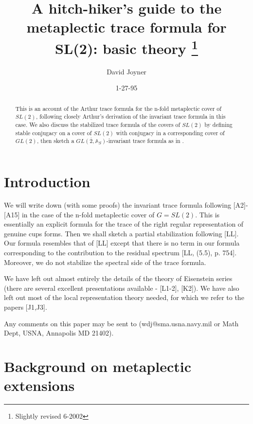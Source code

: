 \documentclass[amsfonts,12pt]{article}
\def\aaa{\mathbb{A}}
\begin{document}
\author{David Joyner}
\title{A hitch-hiker's guide to the
metaplectic trace formula for SL(2): basic theory
\thanks{Slightly revised 6-2002}}
\date{1-27-95}
\maketitle

\begin{abstract}
This is an account of the Arthur trace formula for the
n-fold metaplectic cover of $SL(2)$, following closely
Arthur's derivation of the invariant trace formula in this case.
We also discuss the stabilized trace formula of
the covers of $SL(2)$ by defining
stable conjugacy on a cover of $SL(2)$ with conjugacy
in a corresponding cover of $GL(2)$,
then sketch a $\overline{GL(2,\aaa _S)}$-invariant
trace formula as in \cite{LL}.
\end{abstract}

\tableofcontents

\section{Introduction}

We will write down (with some proofs) the invariant trace
formula following [A2]-[A15] in the case of the
n-fold metaplectic cover of $G=SL(2)$.
This is essentially an explicit formula for the trace of
the right regular representation of
genuine cups forms.
Then we shall sketch a partial stabilization following [LL].
Our formula resembles that of [LL] except that there
is no term in our formula corresponding to the
contribution to the residual spectrum
[LL, (5.5), p. 754]. Moreover, we do not stabilize the spectral
side of the trace formula.

We have left out almost entirely the details of the theory of
Eisenstein
series (there are several excellent presentations available -
[L1-2], [K2]). We have also left out most of the
local representation theory needed, for which we refer to the
papers [J1,J3].

Any comments on this paper may be sent to
(wdj@sma.usna.navy.mil or Math Dept, USNA, Annapolis MD 21402).

\section{Background on metaplectic extensions}
\end{document}

